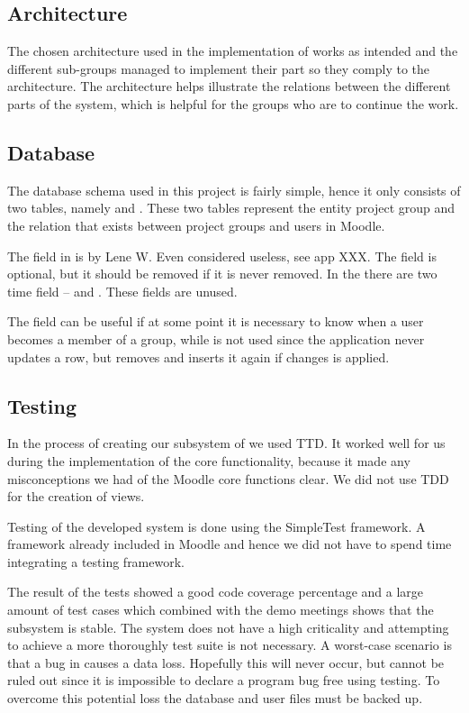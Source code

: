 \subsection{Architecture}
The chosen architecture used in the implementation of \system{} works as intended and the different sub-groups managed to implement their part so they comply to the architecture. 
The architecture helps illustrate the relations between the different parts of the system, which is helpful for the groups who are to continue the work. 




\subsection{Database}
The database schema used in this project is fairly simple, hence it only consists of two tables, namely   and . 
These two tables represent the entity project group and the relation that exists between project groups and users in Moodle. 

The  field in  is by Lene W. Even considered useless, see app XXX. 
The field is optional, but it should be removed if it is never removed. 
In the  there are two time field --  and . 
These fields are unused. 

The field  can be useful if at some point it is necessary to know when a user becomes a member of a group, while  is not used since the application never updates a row, but removes and inserts it again if changes is applied. 



\subsection{Testing}
In the process of creating our subsystem of \system{} we used TTD.
It worked well for us during the implementation of the core functionality, because it made any misconceptions we had of the Moodle core functions clear.
We did not use TDD for the creation of views.

Testing of the developed system is done using the SimpleTest framework. 
A framework already included in Moodle and hence we did not have to spend time integrating a testing framework.

The result of the tests showed a good code coverage percentage and a large amount of test cases which combined with the demo meetings shows that the subsystem is stable. 
The system does not have a high criticality and attempting to achieve a more thoroughly test suite is not necessary. 
A worst-case scenario is that a bug in \system{} causes a data loss. 
Hopefully this will never occur, but cannot be ruled out since it is impossible to declare a program bug free using testing.
To overcome this potential loss the database and user files must be backed up.
